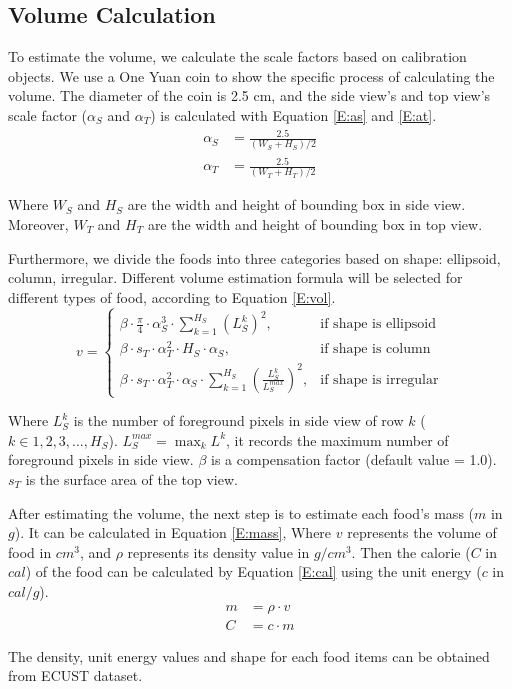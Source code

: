 \documentclass[12pt, a4paper, twoside]{article}
\begin{document}
\subsection{Volume Calculation}
To estimate the volume\cite{vol}, we calculate the scale factors based on calibration objects. We use a One Yuan coin to show the specific process of calculating the volume. The diameter of the coin is 2.5 cm, and the side view’s and top view's scale factor ($\alpha_S$ and $\alpha_T$) is calculated with Equation \ref{E:as} and \ref{E:at}.
\begin{align}
	\alpha_S &= \frac{2.5}{(W_S + H_S)/2} \label{E:as}\\
	\alpha_T &= \frac{2.5}{(W_T + H_T)/2 \label{E:at}}
\end{align}
\par
Where $W_S$ and $H_S$ are the width and height of bounding box in side view. Moreover, $W_T$ and $H_T$ are the width and height of bounding box in top view.
\par
Furthermore, we divide the foods into three categories based on shape: ellipsoid, column, irregular. Different volume estimation formula will be selected for different types of food, according to Equation \ref{E:vol}. 
\begin{equation}\label{E:vol}
	v = 
	\begin{cases}
		\beta \cdot \frac{\pi}{4} \cdot \alpha_S^3 \cdot \sum_{k=1}^{H_S} (L^k_S)^2, &\text{if shape is ellipsoid} \\
		\beta \cdot  s_T \cdot \alpha_T^2 \cdot H_S \cdot \alpha_S, &\text{if shape is column} \\
		\beta \cdot  s_T \cdot \alpha_T^2 \cdot \alpha_S \cdot \sum_{k=1}^{H_S} \left(\frac{L^k_S}{L_S^{max}}\right)^2, &\text{if shape is irregular} 
	\end{cases}
\end{equation}
\par
Where $L^k_S$ is the number of foreground pixels in side view of row $k$ ($k \in 1, 2, 3, \dots , H_S$). $L^{max}_S = \max_{k} L^k$, it records the maximum number of foreground pixels in side view. $\beta$ is a compensation factor (default value = 1.0).  $s_T$ is the surface area of the top view.
\par
After estimating the volume, the next step is to estimate each food’s mass ($m$ in $g$). It can be calculated in Equation \ref{E:mass}, Where $v$ represents the volume of food in $cm^3$, and  $\rho$ represents its density value in $g/cm^3$. Then the calorie ($C$ in $cal$) of the food can be calculated by Equation \ref{E:cal} using the unit energy ($c$ in $cal/g$).
\begin{align}
	m &= \rho \cdot v \label{E:mass} \\
	C &= c \cdot m \label{E:cal}
\end{align}
\par
The density, unit energy values and shape for each food items can be obtained from ECUST dataset.
\end{document}
